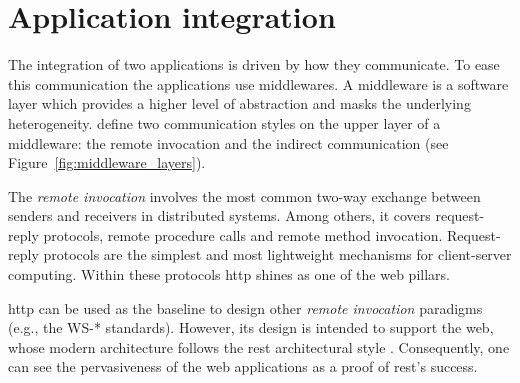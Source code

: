\section{Application integration}
\label{sec:soa_integration}

%
%


The integration of two applications is driven by how they communicate.
To ease this communication the applications use middlewares.
A middleware is a software layer which provides a higher level of abstraction and masks the underlying heterogeneity.
\citet{coulouris_distributed_2012} define two communication styles on the upper layer of a middleware: %
the remote invocation and the indirect communication (see Figure~\ref{fig:middleware_layers}).



\medskip

The \emph{remote invocation} involves the most common two-way exchange between senders and receivers in distributed systems.
Among others, it covers request-reply protocols, remote procedure calls and remote method invocation.
Request-reply protocols are the simplest and most lightweight mechanisms for client-server computing. %
Within these protocols \ac{http} shines as one of the web pillars.


\ac{http} can be used as the baseline to design other \emph{remote invocation} paradigms (e.g., the WS-* \citep{alonso_web_2010} standards).
However, its design is intended to support the web, whose modern architecture follows the \ac{rest} architectural style \citep{fielding_architectural_2000}.
Consequently, one can see the pervasiveness of the web applications as a proof of \ac{rest}'s success.

